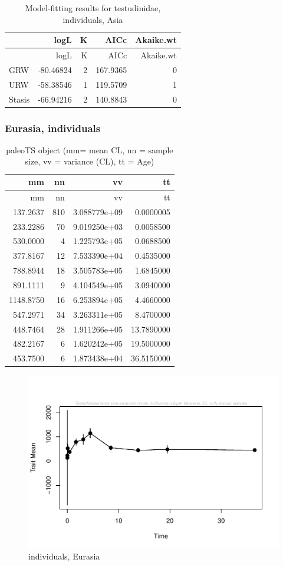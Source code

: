 \documentclass[]{article}
\begin{document}
\begin{longtable}[]{@{}lrrrr@{}}
\caption{Model-fitting results for testudinidae, individuals,
Asia}\tabularnewline
\toprule
& logL & K & AICc & Akaike.wt\tabularnewline
\midrule
\endfirsthead
\toprule
& logL & K & AICc & Akaike.wt\tabularnewline
\midrule
\endhead
GRW & -80.46824 & 2 & 167.9365 & 0\tabularnewline
URW & -58.38546 & 1 & 119.5709 & 1\tabularnewline
Stasis & -66.94216 & 2 & 140.8843 & 0\tabularnewline
\bottomrule
\end{longtable}

\newpage

\subsubsection{Eurasia, individuals}\label{eurasia-individuals}

\begin{longtable}[]{@{}rrrr@{}}
\caption{paleoTS object (mm= mean CL, nn = sample size, vv = variance
(CL), tt = Age)}\tabularnewline
\toprule
mm & nn & vv & tt\tabularnewline
\midrule
\endfirsthead
\toprule
mm & nn & vv & tt\tabularnewline
\midrule
\endhead
137.2637 & 810 & 3.088779e+09 & 0.0000005\tabularnewline
233.2286 & 70 & 9.019250e+03 & 0.0058500\tabularnewline
530.0000 & 4 & 1.225793e+05 & 0.0688500\tabularnewline
377.8167 & 12 & 7.533390e+04 & 0.4535000\tabularnewline
788.8944 & 18 & 3.505783e+05 & 1.6845000\tabularnewline
891.1111 & 9 & 4.104549e+05 & 3.0940000\tabularnewline
1148.8750 & 16 & 6.253894e+05 & 4.4660000\tabularnewline
547.2971 & 34 & 3.263311e+05 & 8.4700000\tabularnewline
448.7464 & 28 & 1.911266e+05 & 13.7890000\tabularnewline
482.2167 & 6 & 1.620242e+05 & 19.5000000\tabularnewline
453.7500 & 6 & 1.873438e+04 & 36.5150000\tabularnewline
\bottomrule
\end{longtable}

\begin{figure}[htbp]
\centering
\includegraphics{MA_JJ_files/figure-latex/paleoTS, individuals, Eurasia-1.pdf}
\caption{individuals, Eurasia}
\end{figure}
\end{document}
